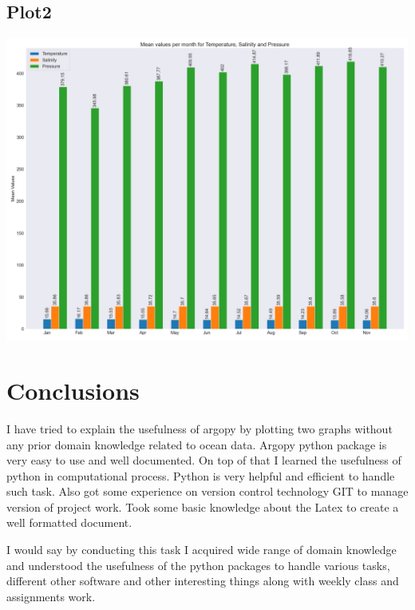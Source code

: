 \documentclass[12pt, letterpaper]{article}
\begin{document}
\subsection{Plot2}
 \includegraphics[width=\textwidth]{plot2.png}



\section{Conclusions}

I have tried to explain the usefulness of argopy by plotting two graphs without any prior domain knowledge related to ocean data. Argopy python package is very easy to use and well documented. On top of that I learned the usefulness of python in computational process. Python is very helpful and efficient to handle such task. Also got some experience on version control technology GIT to manage version of project work. Took some basic knowledge about the Latex to create a well formatted document.

I would say by conducting this task I acquired wide range of domain knowledge and understood the usefulness of the python packages to handle various tasks, different other software and other interesting things along with weekly class and assignments work.
\end{document}
